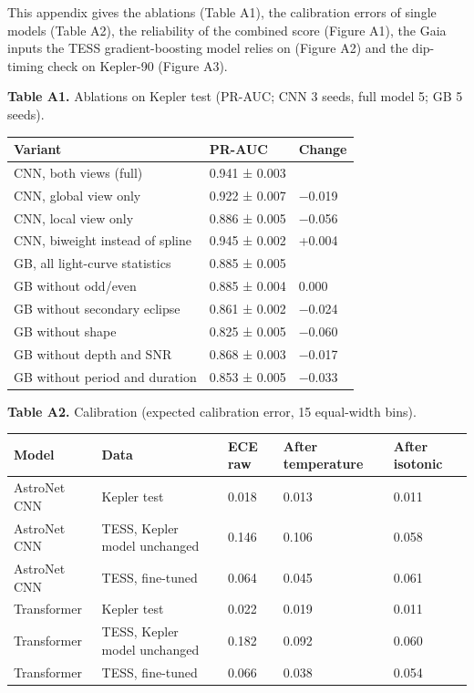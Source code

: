 \documentclass[
]{article}
\begin{document}
This appendix gives the ablations (Table A1), the calibration errors of
single models (Table A2), the reliability of the combined score (Figure
A1), the Gaia inputs the TESS gradient-boosting model relies on (Figure
A2) and the dip-timing check on Kepler-90 (Figure A3).

\textbf{Table A1.} Ablations on Kepler test (PR-AUC; CNN 3 seeds, full
model 5; GB 5 seeds).

\begin{longtable}[]{@{}lll@{}}
\toprule\noalign{}
Variant & PR-AUC & Change \\
\midrule\noalign{}
\endhead
\bottomrule\noalign{}
\endlastfoot
CNN, both views (full) & 0.941 ± 0.003 & \\
CNN, global view only & 0.922 ± 0.007 & −0.019 \\
CNN, local view only & 0.886 ± 0.005 & −0.056 \\
CNN, biweight instead of spline & 0.945 ± 0.002 & +0.004 \\
GB, all light-curve statistics & 0.885 ± 0.005 & \\
GB without odd/even & 0.885 ± 0.004 & 0.000 \\
GB without secondary eclipse & 0.861 ± 0.002 & −0.024 \\
GB without shape & 0.825 ± 0.005 & −0.060 \\
GB without depth and SNR & 0.868 ± 0.003 & −0.017 \\
GB without period and duration & 0.853 ± 0.005 & −0.033 \\
\end{longtable}

\textbf{Table A2.} Calibration (expected calibration error, 15
equal-width bins).

\begin{longtable}[]{@{}lllll@{}}
\toprule\noalign{}
Model & Data & ECE raw & After temperature & After isotonic \\
\midrule\noalign{}
\endhead
\bottomrule\noalign{}
\endlastfoot
AstroNet CNN & Kepler test & 0.018 & 0.013 & 0.011 \\
AstroNet CNN & TESS, Kepler model unchanged & 0.146 & 0.106 & 0.058 \\
AstroNet CNN & TESS, fine-tuned & 0.064 & 0.045 & 0.061 \\
Transformer & Kepler test & 0.022 & 0.019 & 0.011 \\
Transformer & TESS, Kepler model unchanged & 0.182 & 0.092 & 0.060 \\
Transformer & TESS, fine-tuned & 0.066 & 0.038 & 0.054 \\
\end{longtable}
\end{document}

